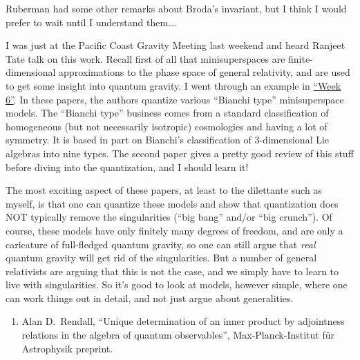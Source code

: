 \documentclass[12pt]{article}
\def\tightlist{}
\renewcommand{\texttt}[1]{%
  \begingroup
  \ttfamily
  \begingroup\lccode`~=`/\lowercase{\endgroup\def~}{/\discretionary{}{}{}}%
  \begingroup\lccode`~=`[\lowercase{\endgroup\def~}{[\discretionary{}{}{}}%
  \begingroup\lccode`~=`.\lowercase{\endgroup\def~}{.\discretionary{}{}{}}%
  \catcode`/=\active\catcode`[=\active\catcode`.=\active
  \scantokens{#1\noexpand}%
  \endgroup
}
\begin{document}
Ruberman had some other remarks about Broda's invariant, but I think I
would prefer to wait until I understand them\ldots.


I was just at the Pacific Coast Gravity Meeting last weekend and heard
Ranjeet Tate talk on this work. Recall first of all that minisuperspaces
are finite-dimensional approximations to the phase space of general
relativity, and are used to get some insight into quantum gravity. I
went through an example in \protect\hyperlink{week6}{``Week 6''}. In
these papers, the authors quantize various ``Bianchi type''
minisuperspace models. The ``Bianchi type'' business comes from a
standard classification of homogeneous (but not necessarily isotropic)
cosmologies and having a lot of symmetry. It is based in part on
Bianchi's classification of 3-dimensional Lie algebras into nine types.
The second paper gives a pretty good review of this stuff before diving
into the quantization, and I should learn it!

The most exciting aspect of these papers, at least to the dilettante
such as myself, is that one can quantize these models and show that
quantization does NOT typically remove the singularities (``big bang''
and/or ``big crunch''). Of course, these models have only finitely many
degrees of freedom, and are only a caricature of full-fledged quantum
gravity, so one can still argue that \emph{real} quantum gravity will
get rid of the singularities. But a number of general relativists are
arguing that this is not the case, and we simply have to learn to live
with singularities. So it's good to look at models, however simple,
where one can work things out in detail, and not just argue about
generalities.

\begin{enumerate}
\def\labelenumi{\arabic{enumi})}
\setcounter{enumi}{6}
\tightlist
\item
  Alan D.\ Rendall, ``Unique determination of an inner product by adjointness relations in
  the algebra of quantum observables'',
  Max-Planck-Institut f\"ur Astrophysik preprint.
\end{enumerate}
\end{document}
